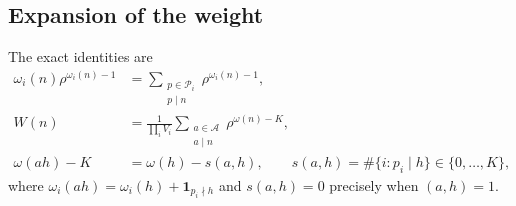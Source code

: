 \documentclass[11pt]{article}
\theoremstyle{definition}
\newcommand{\ind}{\mathbf 1}
\newcommand{\Aset}{\mathcal A}
\theoremstyle{remark}
\numberwithin{equation}{section}
\begin{document}
\subsection{Expansion of the weight}\label{subsec:lambda-expansion}
The exact identities are
\begin{equation}\label{eq:lambda-weight-expansion}
 \begin{split}
 \omega_i(n)\rho^{\omega_i(n)-1}
    &=\sum_{\substack{p\in\mathcal P_i\\p\mid n}}\rho^{\omega_i(n)-1},\\
 W(n)&=\frac1{\prod_iV_i}\sum_{\substack{a\in\Aset\\a\mid n}}
                                \rho^{\omega(n)-K},\\
 \omega(ah)-K&=\omega(h)-s(a,h),\qquad
 s(a,h)=\#\{i:p_i\mid h\}\in\{0,\ldots,K\},
 \end{split}
\end{equation}
where $\omega_i(ah)=\omega_i(h)+\ind_{p_i\nmid h}$ and
$s(a,h)=0$ precisely when $(a,h)=1$.
\end{document}

